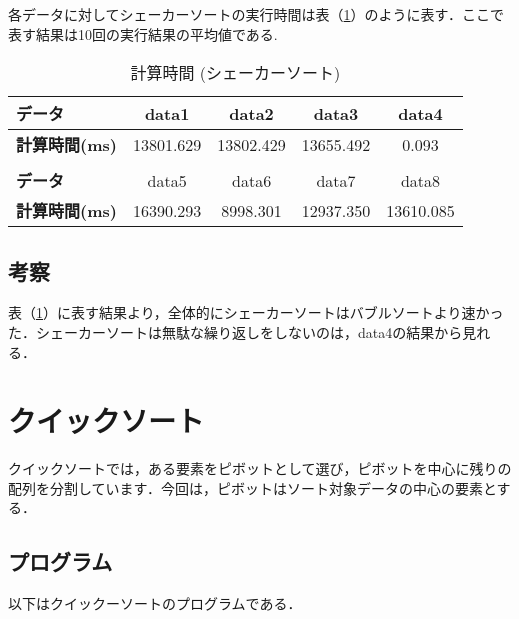 \documentclass[a4j, titlepage]{jarticle}
\begin{document}
            各データに対してシェーカーソートの実行時間は表（\ref{tab:shacker}）のように表す．ここで表す結果は10回の実行結果の平均値である.

            \begin{table}[tbh]
                \caption{計算時間 (シェーカーソート)}
                \label{tab:shacker}
                \begin{center}
                    \begin{tabular}{lcccc}
                        \hline
                        \textbf{データ} & data1 & data2 &data3 &data4 \\ \hline
                        \textbf{計算時間(ms)} & 13801.629 & 13802.429 & 13655.492 & 0.093 \\ \hline
                        \\ \hline
                        \textbf{データ} & data5 &data6 &data7 &data8\\ \hline
                        \textbf{計算時間(ms)} & 16390.293 & 8998.301 & 12937.350 & 13610.085 \\ \hline
                    \end{tabular}
                \end{center}
            \end{table}
        
        \subsection{考察}
            表（\ref{tab:shacker}）に表す結果より，全体的にシェーカーソートはバブルソートより速かった．シェーカーソートは無駄な繰り返しをしないのは，data4の結果から見れる．
        

        \section{クイックソート}
            クイックソートでは，ある要素をピボットとして選び，ピボットを中心に残りの配列を分割しています．今回は，ピボットはソート対象データの中心の要素とする．

        \subsection{プログラム}
            以下はクイックーソートのプログラムである．
            
\end{document}
